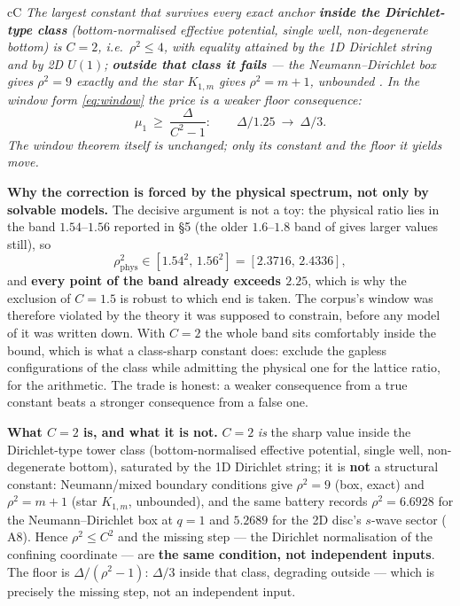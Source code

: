 \begin{claimbox}{cC}
 \emph{The largest constant
that survives every exact anchor \textbf{inside the Dirichlet-type class} (bottom-normalised
effective potential, single well, non-degenerate bottom) is $C=2$, i.e.\ $\rho^2\le4$, with equality
attained by the 1D Dirichlet string and by 2D $U(1)$; \textbf{outside that class it fails} --- the
Neumann--Dirichlet box gives $\rho^2=9$ exactly and the star $K_{1,m}$ gives $\rho^2=m+1$,
unbounded \LC. In the window form \eqref{eq:window} the price is a weaker floor consequence:}
\[
  \mu_1\ \ge\ \frac{\Delta}{C^2-1}:\qquad
  \Delta/1.25\ \longrightarrow\ \Delta/3 .
\]
\emph{The window theorem itself is unchanged; only its constant and the floor it yields move.}
\end{claimbox}

\textbf{Why the correction is forced by the physical spectrum, not only by solvable models.} The
decisive argument is not a toy: the physical ratio lies in the band $1.54$--$1.56$ reported in
 \S5 (the older $1.6$--$1.8$ band of
 gives larger values still), so
\begin{equation}
  \rho^2_{\mathrm{phys}}\in[1.54^2,\,1.56^2]=[2.3716,\,2.4336],
  \label{eq:physwindow}
\end{equation}
and \textbf{every point of the band already exceeds $2.25$}, which is why the exclusion of $C=1.5$
is robust to which end is taken. The corpus's window was therefore violated by the theory it was
supposed to constrain, before any model of it was written down. With $C=2$ the whole band sits
comfortably inside the bound, which
is what a class-sharp constant does: exclude the gapless configurations of the class while admitting
the physical one \LE{} for the lattice ratio, \LT{} for the arithmetic. The trade is honest: a
weaker consequence from a true constant beats a stronger consequence from a false one.

\textbf{What $C=2$ is, and what it is not.} $C=2$ \emph{is} the sharp value inside the Dirichlet-type
tower class (bottom-normalised effective potential, single well, non-degenerate bottom), saturated by
the 1D Dirichlet string; it is \textbf{not} a structural constant: Neumann/mixed boundary conditions
give $\rho^2=9$ (box, exact) and $\rho^2=m+1$ (star $K_{1,m}$, unbounded), and the same battery
records $\rho^2=6.6928$ for the Neumann--Dirichlet box at $q=1$ and $5.2689$ for the 2D disc's
$s$-wave sector ( A8). Hence $\rho^2\le C^2$ and the
missing step --- the Dirichlet normalisation of the confining coordinate --- are \textbf{the same
condition, not independent inputs}. The floor is $\Delta/(\rho^2-1)$: $\Delta/3$ inside that class,
degrading outside --- which is precisely the missing step, not an independent input.

